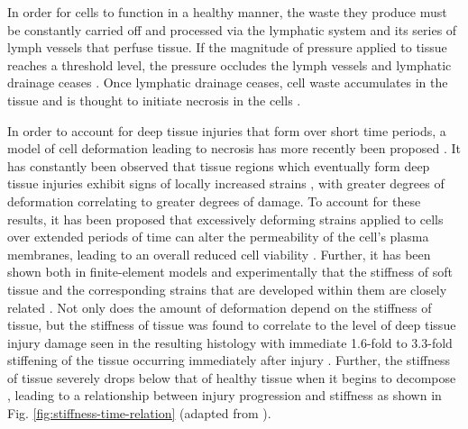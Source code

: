 			In order for cells to function in a healthy manner, the waste they produce must be constantly carried off and processed via the lymphatic system and its series of lymph vessels that perfuse tissue. If the magnitude of pressure applied to tissue reaches a threshold level, the pressure occludes the lymph vessels and lymphatic drainage ceases \cite{miller81}. Once lymphatic drainage ceases, cell waste accumulates in the tissue and is thought to initiate necrosis in the cells \cite{krouskop78,reddy81,braden87}.

			In order to account for deep tissue injuries that form over short time periods, a model of cell deformation leading to necrosis has more recently been proposed \cite{landsman95,bouten01,wang05}. It has constantly been observed that tissue regions which eventually form deep tissue injuries exhibit signs of locally increased strains \cite{stekelenburg06,ceelen08,linderganz08,portnoy09,solis12-03}, with greater degrees of deformation correlating to greater degrees of damage. To account for these results, it has been proposed that excessively deforming strains applied to cells over extended periods of time can alter the permeability of the cell's plasma membranes, leading to an overall reduced cell viability \cite{slomka12}. Further, it has been shown both in finite-element models and experimentally that the stiffness of soft tissue and the corresponding strains that are developed within them are closely related \cite{loerakker13,gefen05,linderganz09,nagel09}. Not only does the amount of deformation depend on the stiffness of tissue, but the stiffness of tissue was found to correlate to the level of deep tissue injury damage seen in the resulting histology \cite{gefen04} with immediate 1.6-fold to 3.3-fold stiffening of the tissue occurring immediately after injury \cite{gefen05,linderganz04}. Further, the stiffness of tissue severely drops below that of healthy tissue when it begins to decompose \cite{gefen05,dimaio01}, leading to a relationship between injury progression and stiffness as shown in Fig. \ref{fig:stiffness-time-relation} (adapted from \cite{gefen09}).

